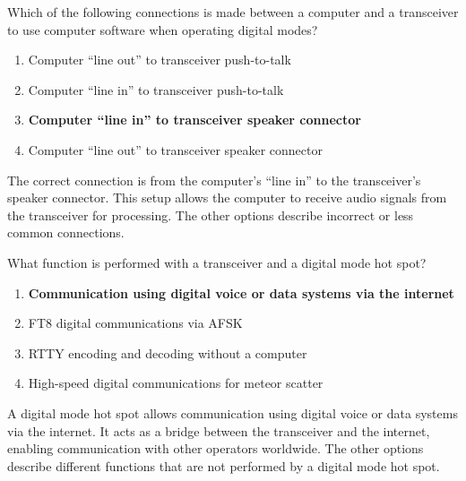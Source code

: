 
\begin{tcolorbox}[colback=gray!10!white,colframe=black!75!black,title={T4A07}]
    Which of the following connections is made between a computer and a transceiver to use computer software when operating digital modes?
    \begin{enumerate}[label=\Alph*,noitemsep]
        \item Computer “line out” to transceiver push-to-talk
        \item Computer “line in” to transceiver push-to-talk
        \item \textbf{Computer “line in” to transceiver speaker connector}
        \item Computer “line out” to transceiver speaker connector
    \end{enumerate}
\end{tcolorbox}
The correct connection is from the computer's “line in” to the transceiver's speaker connector. This setup allows the computer to receive audio signals from the transceiver for processing. The other options describe incorrect or less common connections.


\begin{tcolorbox}[colback=gray!10!white,colframe=black!75!black,title={T4A10}]
    What function is performed with a transceiver and a digital mode hot spot?
    \begin{enumerate}[label=\Alph*,noitemsep]
        \item \textbf{Communication using digital voice or data systems via the internet}
        \item FT8 digital communications via AFSK
        \item RTTY encoding and decoding without a computer
        \item High-speed digital communications for meteor scatter
    \end{enumerate}
\end{tcolorbox}
A digital mode hot spot allows communication using digital voice or data systems via the internet. It acts as a bridge between the transceiver and the internet, enabling communication with other operators worldwide. The other options describe different functions that are not performed by a digital mode hot spot.


